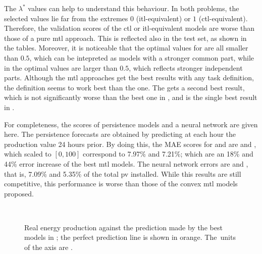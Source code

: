 %
The $\lambda^*$ values can help to understand this behaviour. In both problems, the selected values lie far from the extremes $0$ (\acrshort{itl}-equivalent) or $1$ (\acrshort{ctl}-equivalent). Therefore, the validation scores of the \acrshort{ctl} or \acrshort{itl}-equivalent models are worse than those of a pure \acrshort{mtl} approach. This is reflected also in the test set, as shown in the tables.
Moreover, it is noticeable that the optimal values for  are all smaller than $0.5$, which can be intepreted as models with a stronger common part, while in  the optimal values are larger than $0.5$, which reflects stronger independent parts.
%
Although the \acrshort{mtl} approaches get the best results with any task definition, the  definition seems to work best than the  one. The  gets a second best result, which is not significantly worse than the best one in , and is the single best result in .

%
For completeness, the scores of persistence models and a neural network are given here.
The persistence forecasts are obtained by predicting at each hour the production value 24 hours prior. By doing this, the MAE scores for  and  are  and , which scaled to $[0, 100]$ correspond to 7.97\% and 7.21\%; which are an 18\% and 44\% error increase of the best \acrshort{mtl} models.
The neural network errors are  and , that is, 7.09\% and 5.35\% of the total \acrshort{pv} installed. While this results are still competitive, this performance is worse than those of the convex \acrshort{mtl} models proposed.


\begin{figure}[t!]
    \centering%
    \quad%
    \quad%
    \\
 \caption{\label{fig:majorca_best_plots} Real energy production against the prediction made by the best  models {in} ; the perfect prediction line is shown in orange. The~units of the axis are \mwhu{}.}
\end{figure}

